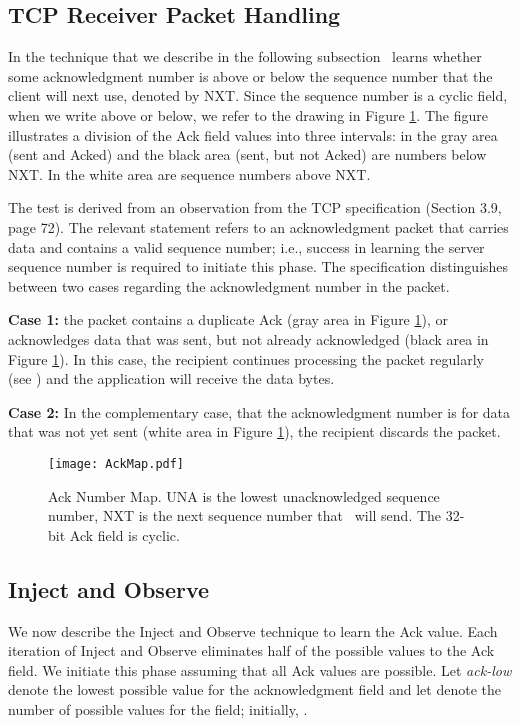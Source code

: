 \documentclass[conference]{IEEEtran}
\newcommand{\ignore}[1]{}
\begin{document}
\subsection{TCP Receiver Packet Handling} \label{tcprecv}

In the technique that we describe in the following subsection \mal\ learns whether some acknowledgment number is above or below the sequence number that the client will next use, denoted by NXT. Since the sequence number is a cyclic field, when we write above or below, we refer to the drawing in Figure \ref{fig:AckMap}. The figure illustrates a division of the Ack field values into three intervals: in the gray area (sent and Acked) and the black area (sent, but not Acked) are numbers below NXT. In the white area are sequence numbers above NXT. 

The test is derived from an observation from the TCP specification \cite{rfc793} (Section 3.9, page 72). The relevant statement refers to an acknowledgment packet that carries data and contains a valid sequence number; i.e., success in learning the server sequence number is required to initiate this phase. The specification distinguishes between two cases regarding the acknowledgment number in the packet. 

{\bf Case 1:} the packet contains a duplicate Ack (gray area in Figure \ref{fig:AckMap}), or acknowledges data that was sent, but not already acknowledged (black area in Figure \ref{fig:AckMap}). In this case, the recipient continues processing the packet regularly (see \cite{rfc793}) and the application will receive the data bytes.

{\bf Case 2:} In the complementary case, that the acknowledgment number is for data that was not yet sent (white area in Figure \ref{fig:AckMap}), the recipient discards the packet.

\begin{figure}
	\centering
		\texttt{[image: AckMap.pdf]}
	\caption{Ack Number Map. UNA is the lowest unacknowledged sequence number, NXT is the next sequence number that \wini\ will send. \ignore{Acknowledgments for data in the {\em gray} area are considered duplicates, acknowledgments for data in the {\em white} area are for unsent data, i.e., invalid. In the {\em black} area are sequence numbers for sent un-Acked data. }The 32-bit Ack field is cyclic.}
	\label{fig:AckMap}
\end{figure}

\subsection{Inject and Observe} \label{clientsnum}
We now describe the Inject and Observe technique to learn the Ack value. Each iteration of Inject and Observe eliminates half of the possible values to the Ack field. We initiate this phase assuming that all Ack values are possible. Let \textit{ack-low} denote the lowest possible value for the acknowledgment field and let  denote the number of possible values for the field; initially, . 
\end{document}
